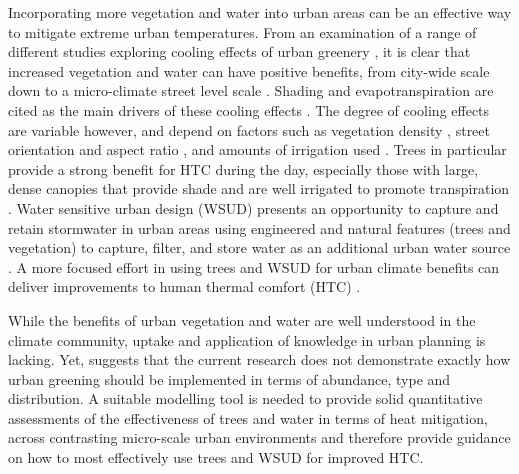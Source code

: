 \documentclass[final,3p,times,authoryear]{elsarticle}
\begin{document}
Incorporating more vegetation and water into urban areas can be an effective way to mitigate extreme urban temperatures. From an examination of a range of different studies exploring cooling effects of urban greenery \citep{Tsiros2010,Shashua-Bar2010a,Spangenberg2008}, it is clear that increased vegetation and water can have positive benefits, from city-wide scale down to a micro-climate street level scale \citep{Coutts2012}. Shading and evapotranspiration are cited as the main drivers of these cooling effects \citep{Bowler2010}. The degree of cooling effects are variable however, and depend on factors such as vegetation density \citep{Hall2016,Bodnaruk2017}, street orientation and aspect ratio \citep{Thorsson2011,Ali-Toudert2006b}, and amounts of irrigation used \citep{Jenerette2011}. Trees in particular provide a strong benefit for HTC during the day, especially those with large, dense canopies that provide shade and are well irrigated to promote transpiration \citep{Coutts2015,Huang2008,Ylmaz2007,Shashua-Bar2000}. Water sensitive urban design (WSUD) presents an opportunity to capture and retain stormwater in urban areas using engineered and natural features (trees and vegetation) to capture, filter, and store water as an additional urban water source \citep{Wong2009}. A more focused effort in using trees and WSUD for urban climate benefits can deliver improvements to human thermal comfort (HTC) \citep{Coutts2012}. 


While the benefits of urban vegetation and water are well understood in the climate community, uptake and application of knowledge in urban planning is lacking. Yet, \cite{Bowler2010} suggests that the current research does not demonstrate exactly how urban greening should be implemented in terms of abundance, type and distribution.  A suitable modelling tool is needed to provide solid quantitative assessments of the effectiveness of trees and water in terms of heat mitigation, across contrasting micro-scale urban environments and therefore provide guidance on how to most effectively use trees and WSUD for improved HTC. 
\end{document}
